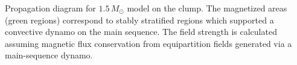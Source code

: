 \label{fig:ClumpProp}
Propagation diagram for $1.5 \, M_\odot$ model on the clump. The magnetized areas (green regions) correspond to stably stratified regions which supported a convective dynamo on the main sequence. The field strength is calculated assuming magnetic flux conservation from equipartition fields generated via a main-sequence dynamo.